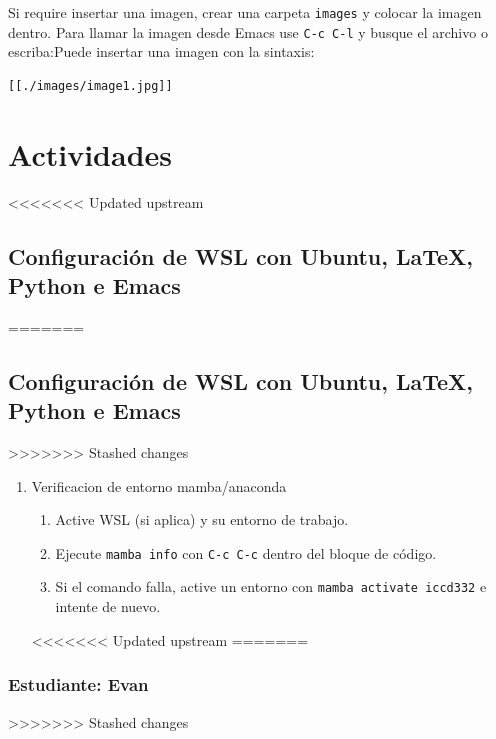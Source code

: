 \documentclass{article}
\begin{document}
Si require insertar una imagen, crear una carpeta \texttt{images} y colocar
la imagen dentro. Para llamar la imagen desde Emacs use \texttt{C-c C-l} y
busque el archivo o escriba:Puede insertar una imagen con la sintaxis:

\begin{verbatim}
[[./images/image1.jpg]]
\end{verbatim}
\section{Actividades}
<<<<<<< Updated upstream
\label{sec:orgeb852f8}
\subsection{Configuración de WSL con Ubuntu, \LaTeX, Python e Emacs}
\label{sec:org6ed92ea}
=======
\label{sec:org1432c23}
\subsection{Configuración de WSL con Ubuntu, \LaTeX, Python e Emacs}
\label{sec:org5d5a42a}
>>>>>>> Stashed changes

\begin{enumerate}
\item Verificacion de entorno mamba/anaconda
\begin{enumerate}
\item Active WSL (si aplica) y su entorno de trabajo.
\item Ejecute \texttt{mamba info} con \texttt{C-c C-c} dentro del bloque de código.
\item Si el comando falla, active un entorno con \texttt{mamba activate
      iccd332} e intente de nuevo.
\end{enumerate}
<<<<<<< Updated upstream
=======
\end{enumerate}


\subsubsection{Estudiante: Evan}
\label{sec:orga335e62}
>>>>>>> Stashed changes
\end{document}
